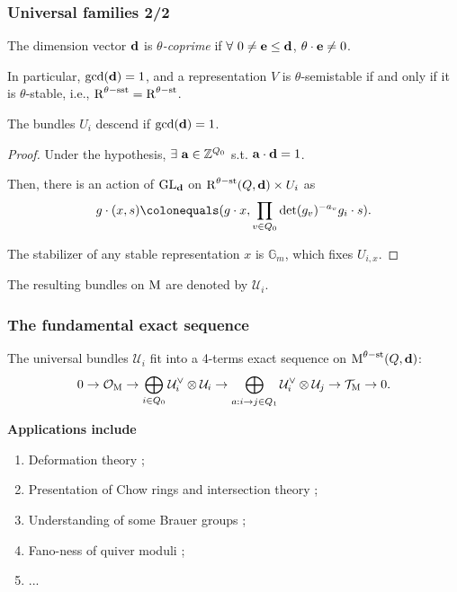 \documentclass{beamer}
\begin{document}
\begin{frame}
    \frametitle{Universal families 2/2}
\begin{definition}
The dimension vector $\mathbf{d}$ is \emph{$\theta$-coprime} if
$\forall~ 0 \neq \mathbf{e} \leq \mathbf{d}$, $\theta \cdot \mathbf{e} \neq 0$.
\end{definition} \pause
In particular, $\gcd(\mathbf{d}) = 1$,
and a representation $V$ is $\theta$-semistable
if and only if it is $\theta$-stable, i.e., $\operatorname{R}^{\theta-\mathrm{sst}} = \operatorname{R}^{\theta-\mathrm{st}}$. \pause

\begin{lemma}
    The bundles $U_i$ descend if $\gcd(\mathbf{d}) = 1$.
\end{lemma}\pause
\begin{proof}
Under the hypothesis, $\exists~\mathbf{a} \in \mathbb{Z}^{Q_0}$
s.t. $\mathbf{a} \cdot \mathbf{d} = 1$. \pause

Then, there is an action of $\operatorname{\operatorname{GL}_{\mathbf{d}}}$ on
$\operatorname{R}^{\theta-\mathrm{st}}(Q, \mathbf{d}) \times U_i$ as
\[g \cdot (x, s) \colonequals (g \cdot x, \prod_{v \in Q_0} \det(g_v)^{-a_v} g_i \cdot s). \] \pause

The stabilizer of any stable representation $x$ is $\mathbb{G}_m$, which fixes $U_{i, x}$.
\end{proof} \pause

The resulting bundles on $\operatorname{M}$ are denoted by $\mathcal{U}_i$.

\end{frame}
\begin{frame}
    \frametitle{The fundamental exact sequence}
The universal bundles $\mathcal{U}_i$ fit into a 4-terms exact sequence on $\operatorname{M}^{\theta-\mathrm{st}}(Q, \mathbf{d})$: \pause
\begin{equation}
\label{equation:4-term-exact-sequence}
0
\overset{}{\rightarrow}\mathcal{O}_{\operatorname{M}}
\overset{}{\rightarrow}\bigoplus_{i \in Q_0} \mathcal{U}^\vee_i \otimes \mathcal{U}_i
\overset{}{\rightarrow}\bigoplus_{a: i \overset{}{\rightarrow} j \in Q_1} \mathcal{U}^\vee_{i} \otimes \mathcal{U}_{j}
\overset{}{\rightarrow}\mathcal{T}_{\operatorname{M}}
\overset{}{\rightarrow} 0.
\end{equation} \pause

{\bf Applications include}
\begin{enumerate}
    \item Deformation theory \cite{belmans2023rigidity};
    \item Presentation of Chow rings \cite{Franzen2015} and intersection theory \cite{belmans2023chow};
    \item Understanding of some Brauer groups \cite{reineke2014brauer};
    \item Fano-ness of quiver moduli \cite{Franzen2020};
    \item ...
\end{enumerate}
\end{frame}
\end{document}
